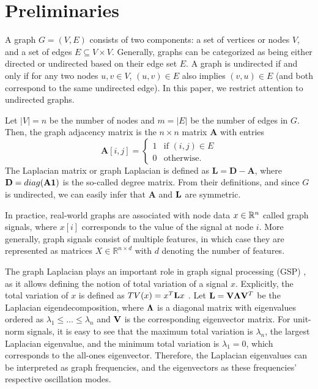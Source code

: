 \section{Preliminaries}

A graph $G=(V,E)$ consists of two components: a set of vertices or nodes $V$, and a set of edges $E \subseteq V \times V$. Generally, graphs can be categorized as being either directed or undirected based on their edge set $E$. A graph is undirected if and only if for any two nodes $u,v \in V$, $(u,v) \in E$ also implies $(v,u) \in E$ (and both correspond to the same undirected edge). In this paper, we restrict attention to undirected graphs.

Let $|V|=n$ be the number of nodes and $m = |E|$ be the number of edges in $G$. Then, the graph adjacency matrix is the $n \times n$ matrix $\mathbf{A}$ with entries 
$$\mathbf{A}[i,j] =
\begin{cases}
    1 & \text{if } (i,j) \in E \\
    0 & \text{otherwise.}
\end{cases}$$ 
The Laplacian matrix or graph Laplacian is defined as $\mathbf{L} = \mathbf{D} - \mathbf{A}$, where ${\mathbf D}=\relax{diag}({\mathbf A}\boldsymbol{1})$ is the so-called degree matrix. From their definitions, and since $G$ is undirected, we can easily infer that $\mathbf{A}$ and ${\mathbf L}$ are symmetric.

In practice, real-world graphs are associated with node data $x \in {\mathbb R}^n$ called graph signals, where $x[i]$ corresponds to the value of the signal at node $i$. More generally, graph signals consist of multiple features, in which case they are represented as matrices $X \in \mathbb{R}^{n \times d}$ with $d$ denoting the number of features. 

The graph Laplacian plays an important role in graph signal processing (GSP) \cite{shuman13-mag,sandryhaila13-dspg}, as it allows defining the notion of total variation of a signal $x$. Explicitly, the total variation of $x$ is defined as $TV(x)=x^T{\mathbf L} x$ \cite{ortega2018graph}. Let ${\mathbf L}={\mathbf V}\boldsymbol{\Lambda}{\mathbf V}^T$ be the Laplacian eigendecomposition, where $\boldsymbol{\Lambda}$ is a diagonal matrix with eigenvalues ordered as $\lambda_1 \leq \ldots \leq \lambda_n$ and ${\mathbf V}$ is the corresponding eigenvector matrix. For unit-norm signals, it is easy to see that the maximum total variation is $\lambda_n$, the largest Laplacian eigenvalue, and the minimum total variation is $\lambda_1=0$, which corresponds to the all-ones eigenvector. Therefore, the Laplacian eigenvalues can be interpreted as graph frequencies, and the eigenvectors as these frequencies' respective oscillation modes.

